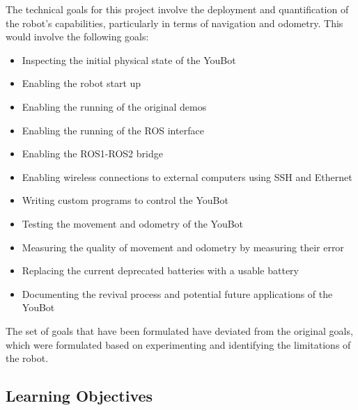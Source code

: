 \documentclass[a4paper, 12pt]{article}
\begin{document}
    The technical goals for this project involve the deployment and quantification of the robot's capabilities, particularly in terms of navigation and odometry. This would involve the following goals: 
    \begin{itemize}[noitemsep, topsep=0pt]
        \item Inspecting the initial physical state of the YouBot
        \item Enabling the robot start up
        \item Enabling the running of the original demos
        \item Enabling the running of the ROS interface
        \item Enabling the ROS1-ROS2 bridge
        \item Enabling wireless connections to external computers using SSH and Ethernet
        \item Writing custom programs to control the YouBot
        \item Testing the movement and odometry of the YouBot
        \item Measuring the quality of movement and odometry by measuring their error
        \item Replacing the current deprecated batteries with a usable battery
        \item Documenting the revival process and potential future applications of the YouBot
    \end{itemize}
    
    The set of goals that have been formulated have deviated from the original goals, which were formulated based on experimenting and identifying the limitations of the robot. 

    \subsection{Learning Objectives}
\end{document}
